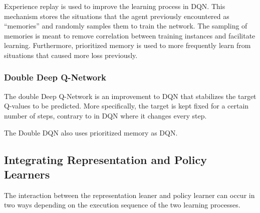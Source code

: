 Experience replay is used to improve the learning process in DQN. 
This mechanism stores the situations that the agent previously encountered as ``memories'' and randomly samples them to train the network. 
The sampling of memories is meant to remove correlation between training instances and facilitate learning.
Furthermore, prioritized memory \citep{prioritized_memory} is used to more frequently learn from situations that caused more loss previously. %



\subsubsection{Double Deep Q-Network}
The double Deep Q-Network \citep{DDQN} is an improvement to DQN that stabilizes the target Q-values to be predicted. 
More specifically, the target is kept fixed for a certain number of steps, contrary to in DQN where it changes every step.

The Double DQN also uses prioritized memory as DQN.

\subsection{Integrating Representation and Policy Learners}
The interaction between the representation leaner and policy learner can occur in two ways depending on the execution sequence of the two learning processes.

